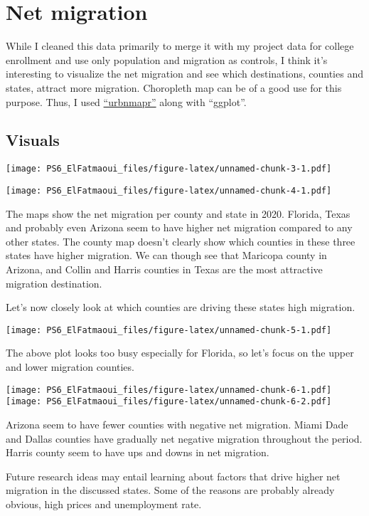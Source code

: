 \documentclass[
]{article}
\begin{document}
\hypertarget{net-migration}{%
\section{Net migration}\label{net-migration}}

While I cleaned this data primarily to merge it with my project data for
college enrollment and use only population and migration as controls, I
think it's interesting to visualize the net migration and see which
destinations, counties and states, attract more migration. Choropleth
map can be of a good use for this purpose. Thus, I used
\href{https://github.com/UrbanInstitute/urbnmapr}{``urbnmapr''} along
with ``ggplot''.

\hypertarget{visuals}{%
\subsection{Visuals}\label{visuals}}

\texttt{[image: PS6\_ElFatmaoui\_files/figure-latex/unnamed-chunk-3-1.pdf]}

\texttt{[image: PS6\_ElFatmaoui\_files/figure-latex/unnamed-chunk-4-1.pdf]}

The maps show the net migration per county and state in 2020. Florida,
Texas and probably even Arizona seem to have higher net migration
compared to any other states. The county map doesn't clearly show which
counties in these three states have higher migration. We can though see
that Maricopa county in Arizona, and Collin and Harris counties in Texas
are the most attractive migration destination.

Let's now closely look at which counties are driving these states high
migration.

\texttt{[image: PS6\_ElFatmaoui\_files/figure-latex/unnamed-chunk-5-1.pdf]}

The above plot looks too busy especially for Florida, so let's focus on
the upper and lower migration counties.

\texttt{[image: PS6\_ElFatmaoui\_files/figure-latex/unnamed-chunk-6-1.pdf]}
\texttt{[image: PS6\_ElFatmaoui\_files/figure-latex/unnamed-chunk-6-2.pdf]}

Arizona seem to have fewer counties with negative net migration. Miami
Dade and Dallas counties have gradually net negative migration
throughout the period. Harris county seem to have ups and downs in net
migration.

Future research ideas may entail learning about factors that drive
higher net migration in the discussed states. Some of the reasons are
probably already obvious, high prices and unemployment rate.
\end{document}
